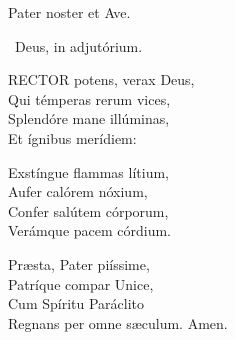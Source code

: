 
Pater noster et Ave.

\V\ Deus, in adjutórium.


\lettrine[lines=2]{R}{ECTOR} potens, verax Deus,\\
Qui témperas rerum vices,\\
Splendóre mane illúminas,\\
Et ígnibus merídiem:

Exstíngue flammas lítium,\\
Aufer calórem nóxium,\\
Confer salútem córporum,\\
Verámque pacem córdium.

Præsta, Pater piíssime,\\
Patríque compar Unice,\\
Cum Spíritu Paráclito\\
Regnans per omne sæculum. Amen.


